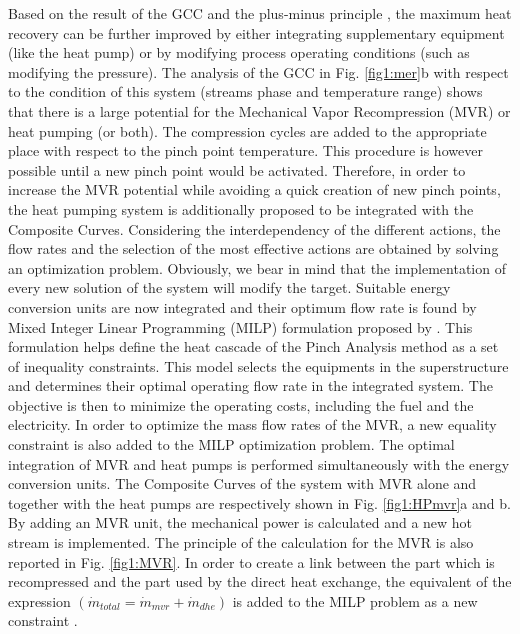 Based on the result of the GCC and the plus-minus principle \cite{Linnhoff1993503}, the maximum heat recovery can be further improved by either integrating supplementary equipment (like the heat pump) or by modifying process operating conditions (such as modifying the pressure). The analysis of the GCC in Fig. \ref{fig1:mer}b with respect to the condition of this system (streams phase and temperature range) shows that there is a large potential for the Mechanical Vapor Recompression (MVR) or heat pumping (or both). The compression cycles are added to the appropriate place with respect to the pinch point temperature. This procedure is however possible until a new pinch point would be activated. Therefore, in order to increase the MVR potential while avoiding a quick creation of new pinch points, the heat pumping system is additionally proposed to be integrated with the Composite Curves. Considering the interdependency of the different actions, the flow rates and the selection of the most effective actions are obtained by solving an optimization problem. Obviously, we bear in mind that the implementation of every new solution of the system will modify the target. Suitable energy conversion units are now integrated and their optimum flow rate is found by Mixed Integer Linear Programming (MILP) formulation proposed by \citet{marechal1998process}. This formulation helps define the heat cascade of the Pinch Analysis method as a set of inequality constraints. This model selects the equipments in the superstructure and determines their optimal operating flow rate in the integrated system. The objective is then to minimize the operating costs, including the fuel and the electricity. In order to optimize the mass flow rates of the MVR, a new equality constraint is also added to the MILP optimization problem. The optimal integration of MVR and heat pumps is performed simultaneously with the energy conversion units. The Composite Curves of the system with MVR alone and together with the heat pumps are respectively shown in Fig. \ref{fig1:HPmvr}a and b. By adding an MVR unit, the mechanical power is calculated and a new hot stream is implemented. The principle of the calculation for the MVR is also reported in Fig. \ref{fig1:MVR}. In order to create a link between the part which is recompressed and the part used by the direct heat exchange, the equivalent of the expression $\left( \dot{m}_{total}=\dot{m}_{mvr}+\dot{m}_{dhe}\right) $ is added to the MILP problem as a new constraint \cite{EPFL-ARTICLE-163637}.


